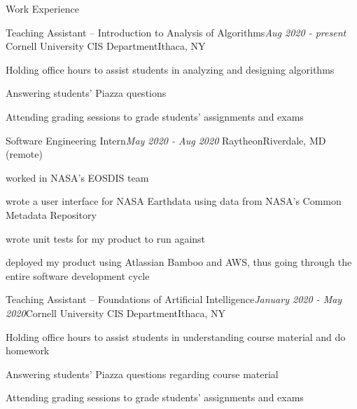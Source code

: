 \documentclass{resume} %
\begin{document}
%
%
%


\begin{rSection}{Work Experience}

\begin{rSubsection}{Teaching Assistant -- Introduction to Analysis of Algorithms}{\em Aug 2020 - present }{Cornell University CIS Department}{Ithaca, NY}
\item Holding office hours to assist students in analyzing and designing algorithms
\item Answering students' Piazza questions
\item Attending grading sessions to grade students' assignments and exams
\end{rSubsection}

\begin{rSubsection}{Software Engineering Intern}{\em May 2020 - Aug 2020 }{Raytheon}{Riverdale, MD (remote)}
\item worked in NASA's EOSDIS team
\item wrote a user interface for NASA Earthdata using data from NASA's Common Metadata Repository
\item wrote unit tests for my product to run against
\item deployed my product using Atlassian Bamboo and AWS, thus going through the entire software development cycle
\end{rSubsection}

\begin{rSubsection}{Teaching Assistant -- Foundations of Artificial Intelligence}{\em January 2020 - May 2020}{Cornell University CIS Department}{Ithaca, NY}
\item Holding office hours to assist students in understanding course material and do homework
\item Answering students' Piazza questions regarding course material
\item Attending grading sessions to grade students' assignments and exams
\end{rSubsection}


\end{rSection}
\end{document}
